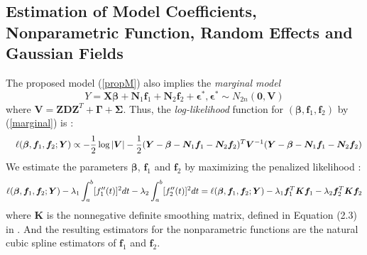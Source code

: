 \documentclass[article,lineno]{biometrika}
\begin{document}
\subsection{Estimation of Model Coefficients, Nonparametric Function, Random Effects and Gaussian Fields} \label{estimation}

The proposed model (\ref{propM}) also implies the {\it marginal model}
\begin{equation}\label{marginal}
Y = \boldsymbol{X}\boldsymbol{\beta} +
 \boldsymbol N_{1} \boldsymbol f_1 + 
  \boldsymbol N_{2} \boldsymbol f_2 + \boldsymbol \epsilon^*,   
\boldsymbol \epsilon^* \sim N_{2n}(\boldsymbol 0, \boldsymbol V) 
\end{equation}
where $\boldsymbol V = \boldsymbol  Z  \boldsymbol D  \boldsymbol Z^T
  +  \boldsymbol  \Gamma
  +   \boldsymbol \Sigma$.
  Thus, the {\it log-likelihood} function for 
$(\boldsymbol \beta, \boldsymbol f_1, \boldsymbol f_2)$ by (\ref{marginal}) is :
\begin{eqnarray*}
&& 
\ell (\boldsymbol \beta, \boldsymbol f_1, \boldsymbol f_2; \boldsymbol Y)
\propto
-{1 \over 2} \log |\boldsymbol V| 
 -{1 \over 2}
 (\boldsymbol Y - \boldsymbol\beta 
 - \boldsymbol N_1 \boldsymbol f_1 - \boldsymbol N_2 \boldsymbol f_2)^T 
 \boldsymbol V^{-1} 
  (\boldsymbol Y - \boldsymbol\beta  
  - \boldsymbol N_1 \boldsymbol f_1 - \boldsymbol N_2 \boldsymbol f_2)
\end{eqnarray*}
We   estimate the parameters $\boldsymbol \beta$, $\boldsymbol f_1$ and $\boldsymbol f_2$ by  maximizing  the penalized likelihood \citep*{Wang:Guo:Brow:quan:2000}:
\begin{equation} \label{penLog}
\ell(\mbox{\boldmath$\beta$}, \boldsymbol f_1, \boldsymbol f_2 ; \boldsymbol Y) 
 - \lambda_1\int_a^b [f_1^{\prime\prime}(t)]^2 dt  
 - \lambda_2 \int_a^b [f_2^{\prime\prime}(t)]^2 dt 
= 
\ell(\mbox{\boldmath$\beta$}, \boldsymbol f_1, \boldsymbol f_2 ; \boldsymbol Y) 
- \lambda_1
\boldsymbol f_1^T \boldsymbol K \boldsymbol f_1
 - \lambda_2
\boldsymbol f_2^T \boldsymbol K \boldsymbol f_2 
\end{equation}
where $\boldsymbol K$ is the nonnegative definite smoothing matrix, defined in Equation (2.3) in \citet{Green:1994}. 
And the resulting estimators for the nonparametric functions  are  the natural cubic spline estimators  of $\boldsymbol f_1$ and $\boldsymbol f_2$. 
\end{document}
